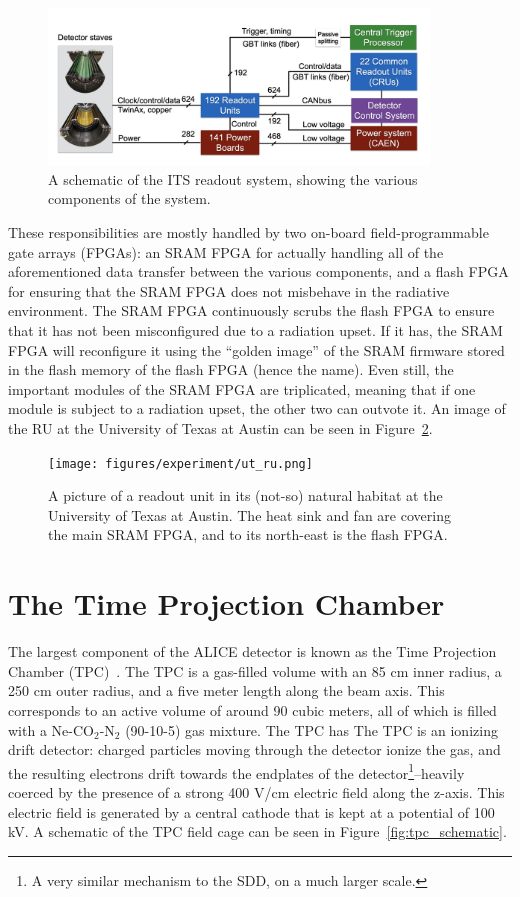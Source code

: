 \begin{figure}[h]
    \centering
    \includegraphics[width=0.9\textwidth]{figures/experiment/its_readout.png}
    \caption{A schematic of the ITS readout system, showing the various components of the system.}
    \label{fig:its_readout}
\end{figure}

These responsibilities are mostly handled by two on-board field-programmable gate arrays (FPGAs): an SRAM FPGA for actually handling all of the aforementioned data transfer between the various components, and a flash FPGA for ensuring that the SRAM FPGA does not misbehave in the radiative environment. The SRAM FPGA continuously scrubs the flash FPGA to ensure that it has not been misconfigured due to a radiation upset. If it has, the SRAM FPGA will reconfigure it using the ``golden image'' of the SRAM firmware stored in the flash memory of the flash FPGA (hence the name). Even still, the important modules of the SRAM FPGA are triplicated, meaning that if one module is subject to a radiation upset, the other two can outvote it. An image of the RU at the University of Texas at Austin can be seen in Figure~\ref{fig:ut_ru}.

\begin{figure}
    \centering
    \texttt{[image: figures/experiment/ut\_ru.png]}
    \caption{A picture of a readout unit in its (not-so) natural habitat at the University of Texas at Austin. The heat sink and fan are covering the main SRAM FPGA, and to its north-east is the flash FPGA.}
    \label{fig:ut_ru}
\end{figure}

\section{The Time Projection Chamber}
\label{sec:tpc}
The largest component of the ALICE detector is known as the Time Projection Chamber (TPC)~\cite{TPC1, TPC2}. The TPC is a gas-filled volume with an 85 cm inner radius, a 250 cm outer radius, and a five meter length along the beam axis. This corresponds to an active volume of around 90 cubic meters, all of which is filled with a Ne-CO$_2$-N$_2$ (90-10-5) gas mixture. The TPC has The TPC is an ionizing drift detector: charged particles moving through the detector ionize the gas, and the resulting electrons drift towards the endplates of the detector\footnote{A very similar mechanism to the SDD, on a much larger scale.}--heavily coerced by the presence of a strong 400 V/cm electric field along the z-axis. This electric field is generated by a central cathode that is kept at a potential of 100 kV. A schematic of the TPC field cage can be seen in Figure~\ref{fig:tpc_schematic}.

